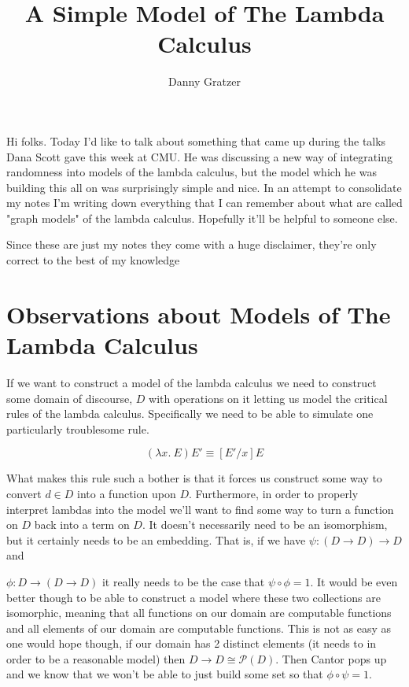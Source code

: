 \documentclass{amsart}
\title{A Simple Model of The Lambda Calculus}
\author{Danny Gratzer}
\begin{document}
\maketitle


Hi folks. Today I'd like to talk about something that came up during
the talks Dana Scott gave this week at CMU. He was discussing a new
way of integrating randomness into models of the lambda calculus, but
the model which he was building this all on was surprisingly simple
and nice. In an attempt to consolidate my notes I'm writing down
everything that I can remember about what are called "graph models" of
the lambda calculus. Hopefully it'll be helpful to someone
else.

Since these are just my notes they come with a huge disclaimer,
they're only correct to the best of my knowledge

\section{Observations about Models of The Lambda Calculus}

If we want to construct a model of the lambda calculus we need to
construct some domain of discourse, $D$ with operations on it letting
us model the critical rules of the lambda calculus. Specifically we
need to be able to simulate one particularly troublesome rule.

\[
    (\lambda x.\ E)E' \equiv [E'/x]E
\]

What makes this rule such a bother is that it forces us construct some
way to convert $d \in D$ into a function upon $D$. Furthermore, in
order to properly interpret lambdas into the model we'll want to find
some way to turn a function on $D$ back into a term on $D$. It
doesn't necessarily need to be an isomorphism, but it certainly needs
to be an embedding. That is, if we have $\psi : (D \to D) \to D$ and

$\phi : D \to (D \to D)$ it really needs to be the case that
$\psi \circ \phi = 1$. It would be even better though to be able to
construct a model where these two collections are isomorphic, meaning
that all functions on our domain are computable functions and all
elements of our domain are computable functions. This is not as easy
as one would hope though, if our domain has 2 distinct elements (it
needs to in order to be a reasonable model) then
$D \to D \cong \mathcal{P}(D)$. Then Cantor pops up and we know that
we won't be able to just build some set so that $\phi \circ \psi = 1$.
\end{document}
